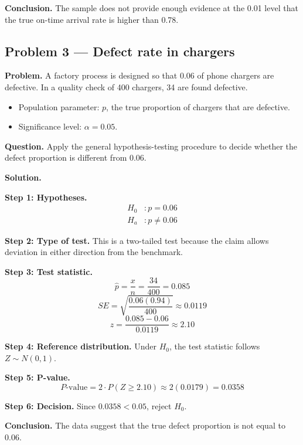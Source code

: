 \begin{ExamProblems}
\textbf{Conclusion.} The sample does not provide enough evidence at the 0.01 level that the true on-time arrival rate is higher than 0.78.

\hypertarget{c4-ex3}{}
\item
\subsection*{Problem 3 — Defect rate in chargers}

\textbf{Problem.} A factory process is designed so that 0.06 of phone chargers are defective. In a quality check of 400 chargers, 34 are found defective.
\begin{itemize}
    \item Population parameter: \(p\), the true proportion of chargers that are defective.
    \item Significance level: \(\alpha=0.05\).
\end{itemize}

\textbf{Question.} Apply the general hypothesis-testing procedure to decide whether the defect proportion is different from 0.06.

\textbf{Solution.}

\textbf{Step 1: Hypotheses.}
\[
\begin{aligned}
H_0&: p = 0.06 \\
H_a&: p \ne 0.06
\end{aligned}
\]

\textbf{Step 2: Type of test.} This is a two-tailed test because the claim allows deviation in either direction from the benchmark.

\textbf{Step 3: Test statistic.}
\[
\hat{p}=\frac{x}{n}=\frac{34}{400}=0.085
\]
\[
SE=\sqrt{\frac{0.06(0.94)}{400}}\approx 0.0119
\]
\[
z=\frac{0.085-0.06}{0.0119}\approx 2.10
\]

\textbf{Step 4: Reference distribution.} Under \(H_0\), the test statistic follows \(Z\sim N(0,1)\).

\textbf{Step 5: P-value.}
\[
P\text{-value}=2\cdot P(Z\ge 2.10)\approx 2(0.0179)=0.0358
\]

\textbf{Step 6: Decision.} Since \(0.0358<0.05\), reject \(H_0\).

\textbf{Conclusion.} The data suggest that the true defect proportion is not equal to 0.06.

\hypertarget{c4-ex4}{}
\item

\end{ExamProblems}
